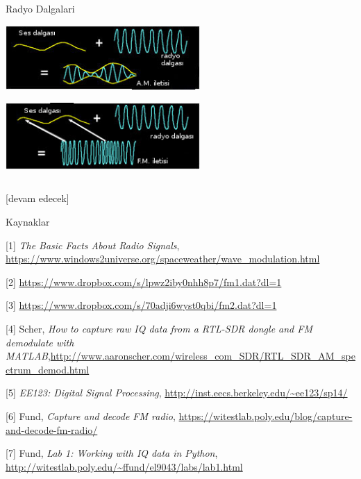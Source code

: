 \documentclass[12pt,fleqn]{article}\usepackage{../../common}
\begin{document}
Radyo Dalgalari

\includegraphics[width=20em]{AM_waves.jpg}

\includegraphics[width=20em]{FM_waves.jpg}

\inputminted[fontsize=\footnotesize]{python}{FMDemodulator.py}

[devam edecek]

Kaynaklar

[1] {\em The Basic Facts About Radio Signals}, \url{https://www.windows2universe.org/spaceweather/wave_modulation.html}

[2] \url{https://www.dropbox.com/s/lpwz2iby0nhh8p7/fm1.dat?dl=1}

[3] \url{https://www.dropbox.com/s/70adji6wyst0qbi/fm2.dat?dl=1}

[4] Scher, {\em How to capture raw IQ data from a RTL-SDR dongle and FM demodulate with MATLAB},\url{http://www.aaronscher.com/wireless_com_SDR/RTL_SDR_AM_spectrum_demod.html}

[5] {\em EE123: Digital Signal Processing}, \url{http://inst.eecs.berkeley.edu/~ee123/sp14/}

[6] Fund, {\em Capture and decode FM radio}, \url{https://witestlab.poly.edu/blog/capture-and-decode-fm-radio/}

[7] Fund, {\em Lab 1: Working with IQ data in Python}, \url{http://witestlab.poly.edu/~ffund/el9043/labs/lab1.html}
\end{document}
